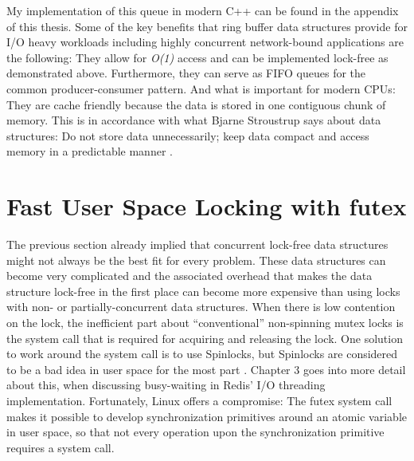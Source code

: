 My implementation of this queue in modern C++ can be found in the appendix of this thesis.
Some of the key benefits that ring buffer data structures provide for I/O heavy workloads including highly concurrent network-bound applications are the following: 
They allow for \textit{O(1)} access and can be implemented lock-free as demonstrated above. Furthermore, they can serve as FIFO queues for the common producer-consumer pattern. And what is important for modern CPUs: They are cache friendly because the data is stored in one contiguous chunk of memory. This is in accordance with what Bjarne Stroustrup says about data structures: Do not store data unnecessarily; keep data compact and access memory in a predictable manner \cite{stroustrup:lists}. 

\section{Fast User Space Locking with futex}
The previous section already implied that concurrent lock-free data structures might not always be the best fit for every problem. These data structures can become very complicated and the associated overhead that makes the data structure lock-free in the first place can become more expensive than using locks with non- or partially-concurrent data structures. When there is low contention on the lock, the inefficient part about “conventional” non-spinning mutex locks is the system call that is required for acquiring and releasing the lock. \newline
One solution to work around the system call is to use Spinlocks, but Spinlocks are considered to be a bad idea in user space for the most part \cite{torvalds:spinlock}. Chapter 3 goes into more detail about this, when discussing busy-waiting in Redis’ I/O threading implementation. \newline
Fortunately, Linux offers a compromise: The futex system call makes it possible to develop
synchronization primitives around an atomic variable in user space, so that not every operation upon the synchronization primitive requires a system call. \newline
